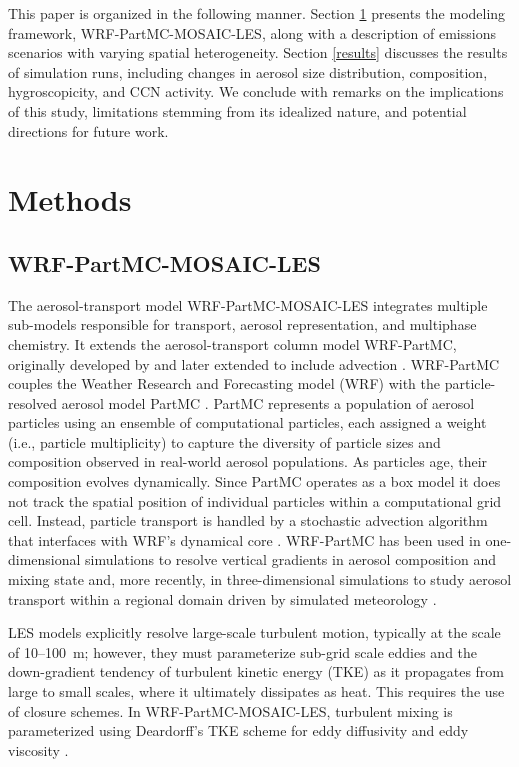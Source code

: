 \documentclass[acp]{copernicus}
\begin{document}
This paper is organized in the following manner. Section \ref{methods}
presents the modeling framework, WRF-PartMC-MOSAIC-LES, along with a
description of emissions scenarios with varying spatial
heterogeneity. Section \ref{results} discusses the results of simulation runs,
including changes in aerosol size distribution, composition,
hygroscopicity, and CCN activity. We conclude with remarks on the
implications of this study, limitations stemming from its idealized
nature, and potential directions for future work.

\section{Methods}\label{methods}

\subsection{WRF-PartMC-MOSAIC-LES}

The aerosol-transport model WRF-PartMC-MOSAIC-LES integrates multiple
sub-models responsible for transport, aerosol representation, and
multiphase chemistry. It extends the aerosol-transport column model
WRF-PartMC, originally developed by \citet{curtis_single-column_2017}
and later extended to include advection
\citep{gmd-17-8399-2024}. WRF-PartMC couples the Weather Research and
Forecasting model (WRF) \citep{skamarock_description_2008} with the
particle-resolved aerosol model PartMC
\citep{riemer_simulating_2009}. PartMC represents a population of
aerosol particles using an ensemble of computational particles, each
assigned a weight (i.e., particle multiplicity) to capture the
diversity of particle sizes and composition observed in real-world
aerosol populations. As particles age, their composition evolves
dynamically. Since PartMC operates as a box model it does not track
the spatial position of individual particles within a computational
grid cell. Instead, particle transport is handled by a stochastic
advection algorithm that interfaces with WRF's dynamical core
\citep{gmd-17-8399-2024}. WRF-PartMC has been used in one-dimensional
simulations to resolve vertical gradients in aerosol composition and
mixing state \citep {curtis_single-column_2017} and, more recently, in
three-dimensional simulations to study aerosol transport within a
regional domain driven by simulated meteorology
\citep{gmd-17-8399-2024}.

LES models explicitly resolve large-scale turbulent motion, typically
at the scale of 10--100~m; however, they must parameterize sub-grid
scale eddies and the down-gradient tendency of turbulent kinetic
energy (TKE) as it propagates from large to small scales, where it
ultimately dissipates as heat. This requires the use of closure
schemes. In WRF-PartMC-MOSAIC-LES, turbulent mixing is parameterized
using Deardorff's TKE scheme for eddy diffusivity and eddy viscosity
\citep{deardorff_stratocumulus-capped_1980}.
\end{document}
